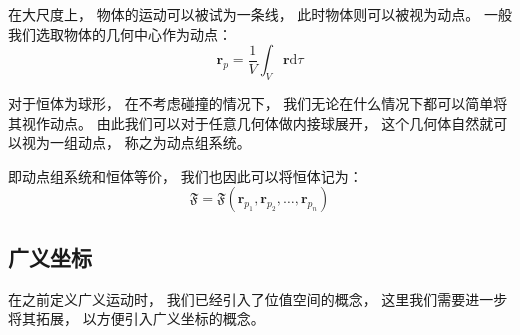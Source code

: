 \documentclass[UTF8,12pt]{ctexart}
\begin{document}
            在大尺度上，
            物体的运动可以被试为一条线，
            此时物体则可以被视为动点。
            一般我们选取物体的几何中心作为动点：
            \begin{equation}
                \textbf{r}_{p}=\frac{1}{V}\int_{V}\textbf{r}\mathrm{d}\tau 
            \end{equation}

            对于恒体为球形，
            在不考虑碰撞的情况下，
            我们无论在什么情况下都可以简单将其视作动点。
            由此我们可以对于任意几何体做内接球展开，
            这个几何体自然就可以视为一组动点，
            称之为动点组系统。

            即动点组系统和恒体等价，
            我们也因此可以将恒体记为：
            \begin{equation}
                \mathfrak{F}=\mathfrak{F}(\textbf{r}_{{p}_1},\textbf{r}_{{p}_2},\dots,\textbf{r}_{{p}_n})
            \end{equation}
        \subsection{广义坐标}
            在之前定义广义运动时，
            我们已经引入了位值空间的概念，
            这里我们需要进一步将其拓展，
            以方便引入广义坐标的概念。
\end{document}

